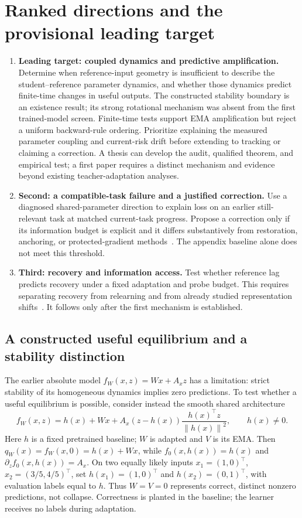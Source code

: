 \documentclass[11pt,a4paper]{article}
\newcommand{\norm}[1]{\left\lVert #1\right\rVert}
\begin{document}
\section{Ranked directions and the provisional leading target}
\begin{enumerate}[leftmargin=*]
\item \textbf{Leading target: coupled dynamics and predictive amplification.}
Determine when reference-input geometry is insufficient to describe the
student--reference parameter dynamics, and whether those dynamics predict
finite-time changes in useful outputs. The constructed stability boundary
is an existence result; its strong rotational mechanism was absent from
the first trained-model screen. Finite-time tests support EMA amplification
but reject a uniform backward-rule ordering. Prioritize explaining the
measured parameter coupling and current-risk drift before extending to
tracking or claiming a correction. A thesis can develop the audit, qualified theorem, and empirical
test; a first paper requires a distinct mechanism and evidence beyond
existing teacher-adaptation analyses.
\item \textbf{Second: a compatible-task failure and a justified correction.}
Use a diagnosed shared-parameter direction to explain loss on an earlier
still-relevant task at matched current-task progress. Propose a correction
only if its information budget is explicit and it differs substantively
from restoration, anchoring, or protected-gradient methods~\cite{ogd}.
The appendix baseline alone does not meet this threshold.
\item \textbf{Third: recovery and information access.}
Test whether reference lag predicts recovery under a fixed adaptation and
probe budget. This requires separating recovery from relearning and from
already studied representation shifts~\cite{spurious}. It follows only
after the first mechanism is established.
\end{enumerate}

\subsection{A constructed useful equilibrium and a stability distinction}
The earlier absolute model $f_W(x,z)=Wx+A_xz$ has a limitation: strict
stability of its homogeneous dynamics implies zero predictions. To test
whether a useful equilibrium is possible, consider instead the smooth
shared architecture
\begin{equation}
 f_W(x,z)=h(x)+Wx+
 A_x(z-h(x))\frac{h(x)^\top z}{\norm{h(x)}^2},
 \qquad h(x)\ne0.
 \label{eq:realization}
\end{equation}
Here $h$ is a fixed pretrained baseline; $W$ is adapted and $V$ is its EMA.
Then $q_W(x)=f_W(x,0)=h(x)+Wx$, while $f_0(x,h(x))=h(x)$ and
$\partial_z f_0(x,h(x))=A_x$. On two equally likely inputs
$x_1=(1,0)^\top$, $x_2=(3/5,4/5)^\top$, set
$h(x_1)=(1,0)^\top$ and $h(x_2)=(0,1)^\top$, with evaluation labels
equal to $h$. Thus $W=V=0$ represents correct, distinct nonzero
predictions, not collapse. Correctness is planted in the baseline;
the learner receives no labels during adaptation.
\end{document}
